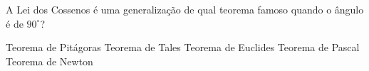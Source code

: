 A Lei dos Cossenos é uma generalização de qual teorema famoso quando o ângulo é de $90^\circ$?

\parbox{\linewidth}{

Teorema de Pitágoras
Teorema de Tales
Teorema de Euclides
Teorema de Pascal
Teorema de Newton

}



